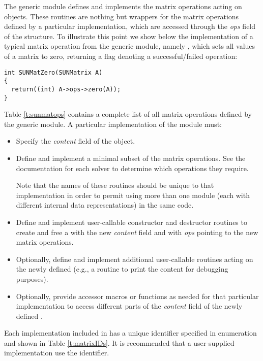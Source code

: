 The generic {\sunmatrix} module defines and implements the matrix operations 
acting on  objects.
These routines are nothing but wrappers for the matrix operations defined by
a particular {\sunmatrix} implementation, which are accessed through the {\em ops}
field of the  structure. To illustrate this point we
show below the implementation of a typical matrix operation from the
generic {\sunmatrix} module, namely , which sets all
values of a matrix  to zero, returning a flag denoting a
successful/failed operation:
\begin{verbatim}
int SUNMatZero(SUNMatrix A)
{
  return((int) A->ops->zero(A));
}
\end{verbatim}
Table \ref{t:sunmatops} contains a complete list of all matrix operations defined
by the generic {\sunmatrix} module.
A particular implementation of the {\sunmatrix} module must:
\begin{itemize}
\item Specify the {\em content} field of the  object.
\item Define and implement a minimal subset of the matrix operations.
  See the documentation for each {\sundials} solver to determine which
  {\sunmatrix} operations they require.

  Note that the names of these routines should be unique to that
  implementation in order to permit using more than one {\sunmatrix}
  module (each with different  internal data
  representations) in the same code. 
\item Define and implement user-callable constructor and destructor
  routines to create and free a  with
  the new {\em content} field and with {\em ops} pointing to the
  new matrix operations.
\item Optionally, define and implement additional user-callable routines
  acting on the newly defined  (e.g., a routine to print
  the content for debugging purposes).
\item Optionally, provide accessor macros or functions as needed for
  that particular implementation to access different parts
  of the {\em content} field of the newly defined . 
\end{itemize}

Each {\sunmatrix} implementation included in {\sundials} has a unique 
identifier specified in enumeration and shown in Table \ref{t:matrixIDs}.
It is recommended that a user-supplied {\sunmatrix} implementation use the 
 identifier.

